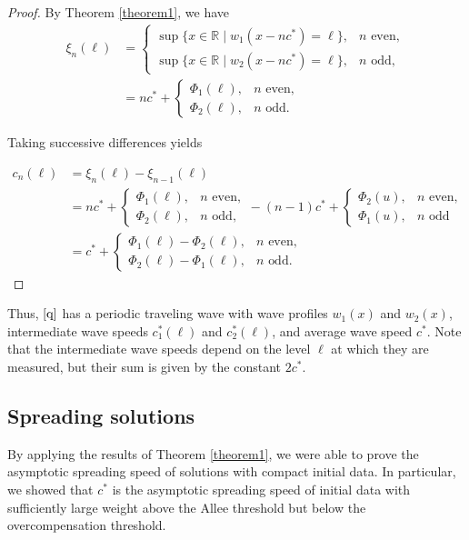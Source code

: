 \documentclass[11pt]{article}
\theoremstyle{definition}
\numberwithin{equation}{section}
\numberwithin{thm}{section}
\begin{document}
\begin{proof}
By Theorem \ref{theorem1}, we have
$$ \begin{aligned}
\xi_n(\ell) &= \begin{cases}
\sup\{x \in \mathbb R \mid w_1(x-nc^*) = \ell \}, & n \text{ even},\\
\sup\{x \in \mathbb R \mid w_2(x-nc^*) = \ell \}, & n \text{ odd},
\end{cases} \\
&= nc^* +  \begin{cases}
\Phi_1(\ell), & n \text{ even}, \\
\Phi_2(\ell), & n \text{ odd}.
\end{cases}
\end{aligned}
$$

Taking successive differences yields

$$ \begin{aligned}
c_n(\ell) &= \xi_n(\ell) - \xi_{n-1}(\ell) \\
&= nc^* +  \begin{cases}
\Phi_1(\ell), & n \text{ even}, \\
\Phi_2(\ell), & n \text{ odd},
\end{cases} - (n-1)c^* +  \begin{cases}
\Phi_2(u), & n \text{ even}, \\
\Phi_1(u), & n \text{ odd}
\end{cases} \\
&= c^* + \begin{cases}
\Phi_1(\ell) - \Phi_2(\ell), & n \text{ even}, \\
\Phi_2(\ell) - \Phi_1(\ell), & n \text{ odd}.
\end{cases}
\end{aligned} $$
\end{proof}

Thus, $\eqref{q}$ has a periodic traveling wave with wave profiles $w_1(x)$ and $w_2(x)$, intermediate wave speeds $c_1^*(\ell)$ and $c_2^*(\ell)$,  and average wave speed  $c^*$. Note that the intermediate wave speeds depend on the level $\ell$ at which they are measured, but their sum is given by the constant $2c^*$.

\subsection{Spreading solutions}

By applying the results of Theorem \ref{theorem1}, we were able to prove the asymptotic spreading speed of solutions with compact initial data. In particular, we showed that $c^*$ is the asymptotic spreading speed of initial data with sufficiently large weight above the Allee threshold but below the overcompensation threshold.
\end{document}
